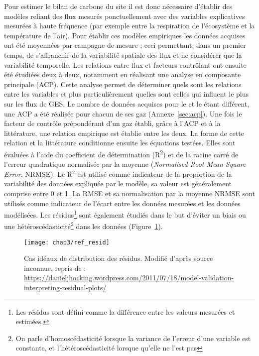 Pour estimer le bilan de carbone du site il est donc nécessaire d'établir des modèles reliant des flux mesurés ponctuellement avec des variables explicatives mesurées à haute fréquence (par exemple entre la respiration de l'écosystème et la température de l'air).
Pour établir ces modèles empiriques les données acquises ont été moyennées par campagne de mesure ; ceci permettant, dans un premier temps, de s'affranchir de la variabilité spatiale des flux et ne considérer que la variabilité temporelle.
Les relations entre flux et facteurs contrôlant ont ensuite été étudiées deux à deux, notamment en réalisant une analyse en composante principale (ACP).
Cette analyse permet de déterminer quels sont les relations entre les variables et plus particulièrement quelles sont celles qui influent le plus sur les flux de GES.
Le nombre de données acquises pour le \coo et le \chh étant différent, une ACP a été réalisée pour chacun de ses gaz (Annexe~\ref{sec:acp}).
Une fois le facteur de contrôle prépondérant d'un gaz établi, grâce à l'ACP et à la littérature, une relation empirique est établie entre les deux.
La forme de cette relation et la littérature conditionne ensuite les équations testées.
Elles sont évaluées à l'aide du coefficient de détermination (R\textsuperscript{2}) et de la racine carré de l'erreur quadratique normalisée par la moyenne (\textit{Normalised Root Mean Square Error}, NRMSE).
Le R$^{2}$ est utilisé comme indicateur de la proportion de la variabilité des données expliquée par le modèle, sa valeur est généralement comprise entre 0 et 1.
La RMSE et sa normalisation par la moyenne NRMSE sont utilisés comme indicateur de l'écart entre les données mesurées et les données modélisées.
Les résidus\footnote{Les résidus sont défini comme la différence entre les valeurs mesurées et estimées.} sont également étudiés dans le but d'éviter un biais ou une hétéroscédasticité\footnote{On parle d'homoscédasticité lorsque la variance de l'erreur d'une variable est constante, et l'hétéroscédasticité lorsque qu'elle ne l'est pas} dans les données (Figure~\ref{fig:ref_resid}).

\begin{figure}[!htb]
\centering
\texttt{[image: chap3/ref\_resid]}
\caption{Cas idéaux de distribution des résidus. Modifié d'après source inconnue, repris de : \url{https://danieljhocking.wordpress.com/2011/07/18/model-validation-interpreting-residual-plots/}}
\label{fig:ref_resid}
\end{figure}

